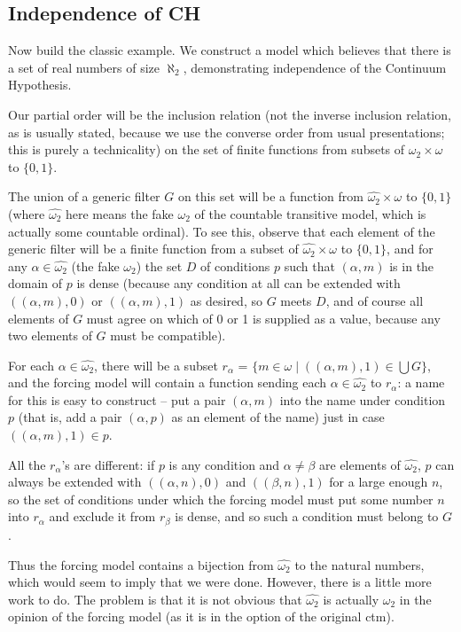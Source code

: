 \documentclass[12pt]{book}
\begin{document}
\subsection{Independence of CH}

Now build the classic example.  We construct a model which believes that there is a set of real numbers of size $\aleph_2$, demonstrating independence of the Continuum Hypothesis.

Our partial order will be the inclusion relation (not the inverse inclusion relation, as is usually stated, because we use the converse order from usual presentations;  this is purely a technicality) on the set of finite functions from subsets of $\omega_2 \times \omega$ to $\{0,1\}$.

The union of a generic filter $G$ on this set will be a function from $\hat{\omega_2} \times \omega$ to $\{0,1\}$ (where $\hat{\omega_2}$ here means the fake $\omega_2$ of the countable transitive model, which is actually some countable ordinal).  To see this, observe that each element of the generic filter
will be a finite function from a subset of $\hat{\omega_2} \times \omega$ to $\{0,1\}$, and for any $\alpha \in \hat{\omega_2}$ (the fake $\omega_2$) the set $D$ of conditions
$p$ such that $(\alpha,m)$ is in the domain of $p$ is dense (because any condition at all can be extended with $((\alpha,m),0)$ or $((\alpha,m),1)$ as desired, so $G$ meets $D$, and of course all elements of $G$ must agree on which of 0 or 1 is supplied as a value, because any two elements of $G$ must be compatible).

 For each $\alpha \in \hat{\omega_2}$, there will be a subset
$r_{\alpha}$ = $\{m \in \omega \mid ((\alpha,m),1) \in \bigcup G\}$, and the forcing model will contain a function sending each $\alpha\in \hat{\omega_2}$ to $r_{\alpha}$:  a name for this is easy to construct -- put a pair $(\alpha,m)$ into the name under condition $p$ (that is, add a pair $(\alpha,p)$ as an element of the name) just in case $((\alpha,m),1)\in p$.

All the $r_{\alpha}$'s are different:  if $p$ is any condition and $\alpha \neq \beta$ are elements of $\hat{\omega_2}$, $p$ can always be extended with 
$((\alpha,n),0)$ and $((\beta,n),1)$ for a large enough $n$, so the set of conditions under which the forcing model must put some number $n$ into $r_{\alpha}$ and exclude it
from $r_{\beta}$ is dense, and so such a condition must belong to $G$.

Thus the forcing model contains a bijection from $\hat{\omega_2}$ to the natural numbers, which would seem to imply that we were done.  However, there is a little more work to do.
The problem is that it is not obvious that $\hat{\omega_2}$ is actually $\omega_2$ in the opinion of the forcing model (as it is in the option of the original ctm).
\end{document}

